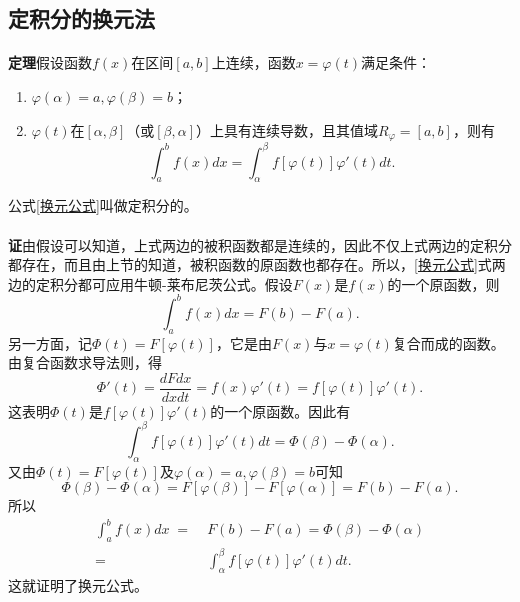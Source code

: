 \subsection{定积分的换元法}
\paragraph{}
\textbf{定理\;}假设函数$f(x)$在区间$[a,b]$上连续，函数$x=\varphi(t)$满足条件：
\begin{enumerate}
  \item $\varphi(\alpha) = a, \varphi(\beta) = b$；
  \item $\varphi(t)$在$[\alpha,\beta]$（或$[\beta,\alpha]$）上具有连续导数，且其值域$R_\varphi=[a,b]$，则有
  \begin{equation}
    \label{换元公式}
    \int_a^bf(x)dx = \int_\alpha^\beta f[\varphi(t)]\varphi'(t)dt.
  \end{equation}
\end{enumerate}
公式\eqref{换元公式}叫做定积分的。

\paragraph{}
\textbf{证\;}由假设可以知道，上式两边的被积函数都是连续的，因此不仅上式两边的定积分都存在，而且由上节的知道，被积函数的原函数也都存在。所以，\eqref{换元公式}式两边的定积分都可应用牛顿-莱布尼茨公式。假设$F(x)$是$f(x)$的一个原函数，则
\begin{equation*}
  \int_a^bf(x)dx = F(b) - F(a).
\end{equation*}
另一方面，记$\Phi(t)=F[\varphi(t)]$，它是由$F(x)$与$x=\varphi(t)$复合而成的函数。由复合函数求导法则，得
\begin{equation*}
  \Phi'(t) = \frac{dFdx}{dxdt} = f(x)\varphi'(t) = f[\varphi(t)]\varphi'(t).
\end{equation*}
这表明$\Phi(t)$是$f[\varphi(t)]\varphi'(t)$的一个原函数。因此有
\begin{equation*}
  \int_\alpha^\beta f[\varphi(t)]\varphi'(t)dt = \Phi(\beta) - \Phi(\alpha).
\end{equation*}
又由$\Phi(t)=F[\varphi(t)]$及$\varphi(\alpha) = a, \varphi(\beta) = b$可知
\begin{equation*}
  \Phi(\beta) - \Phi(\alpha) = F[\varphi(\beta)] - F[\varphi(\alpha)] = F(b) - F(a).
\end{equation*}
所以
\begin{align*}
  \int_a^bf(x)dx \;=&\; F(b) - F(a) = \Phi(\beta) - \Phi(\alpha) \\
  =&\; \int_\alpha^\beta f[\varphi(t)]\varphi'(t)dt.
\end{align*}
这就证明了换元公式。

